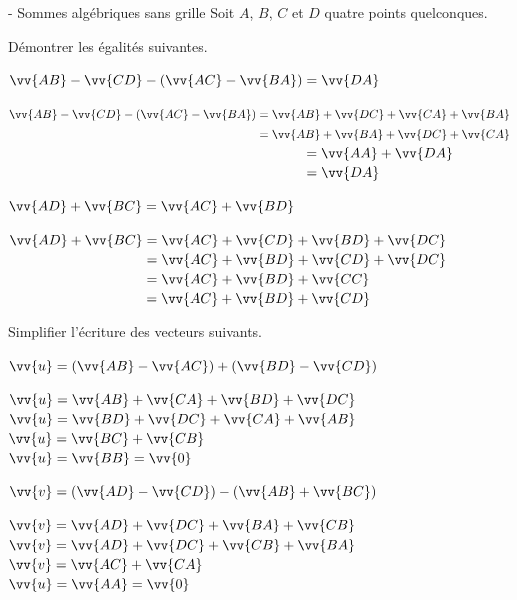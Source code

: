 \documentclass[11pt,a4paper]{article}  %
\begin{document}
\begin{exercice} { - Sommes alg\'ebriques sans grille}
	Soit $A$, $B$, $C$ et $D$ quatre points quelconques.
	\begin{enumMet} \item Démontrer les \'egalit\'es suivantes.
		\begin{enumMet}
			\item 
			$\vv{AB} - \vv{CD} - \left(\vv{AC} -\vv{BA}\right) = \vv{DA}$\\
			\begin{corrBox}
				$\vv{AB} - \vv{CD} - \left(\vv{AC} -\vv{BA}\right)=\vv{AB}+\vv{DC}+\vv{CA}+\vv{BA}$\\
				$\phantom{\vv{AB} - \vv{CD} - \left(\vv{AC} -\vv{BA}\right)}=\vv{AB}+\vv{BA}+\vv{DC}+\vv{CA}$\\
				$\phantom{\vv{AB} - \vv{CD} - \left(\vv{AC} -\vv{BA}\right)}=\vv{AA}+\vv{DA}$\\
				$\phantom{\vv{AB} - \vv{CD} - \left(\vv{AC} -\vv{BA}\right)}=\vv{DA}$\\
			\end{corrBox}
			\item  $\vv{AD} + \vv{BC} = \vv{AC} + \vv{BD}$\\
			\begin{corrBox}
				$\vv{AD} + \vv{BC} =\vv{AC} + \vv{CD}+\vv{BD} + \vv{DC}$\\
				$\phantom{\vv{AD} + \vv{BC}}= \vv{AC} + \vv{BD}+ \vv{CD}+\vv{DC}$\\
				$\phantom{\vv{AD} + \vv{BC}}= \vv{AC} + \vv{BD}+ \vv{CC}$\\
				$\phantom{\vv{AD} + \vv{BC}}= \vv{AC} + \vv{BD}+ \vv{CD}$
			\end{corrBox}
		\end{enumMet}
		
		\item Simplifier l'écriture des vecteurs suivants.
		\begin{enumMet}
			\item $\vv{u} = \left( \vv{AB} -\vv{AC}\right) + \left(\vv{BD} - \vv{CD}\right)$\\
			\begin{corrBox}
				$\vv{u} =\vv{AB}+\vv{CA}+\vv{BD}+\vv{DC}$\\
				$\vv{u} =\vv{BD}+\vv{DC}+\vv{CA}+\vv{AB}$\\
				$\vv{u} =\vv{BC}+\vv{CB}$\\
				$\vv{u} =\vv{BB}=\vv{0}$
			\end{corrBox}
			\item $\vv{v} = \left(\vv{AD} -\vv{CD}\right) - \left(\vv{AB} + \vv{BC}\right)$\\
			\begin{corrBox}
				$\vv{v} =\vv{AD}+\vv{DC}+\vv{BA}+\vv{CB}$\\
				$\vv{v} =\vv{AD}+\vv{DC}+\vv{CB}+\vv{BA}$\\
				$\vv{v} =\vv{AC}+\vv{CA}$\\
				$\vv{u} =\vv{AA}=\vv{0}$
			\end{corrBox}
		\end{enumMet}
	\end{enumMet}
\end{exercice}
\end{document}
